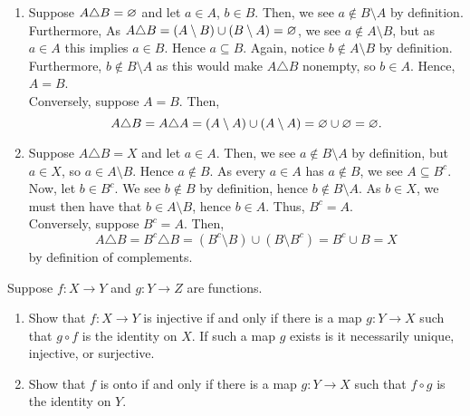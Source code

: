 \documentclass[a4paper]{article}
\begin{document}
\begin{solution}
	\begin{enumerate}
		\item Suppose \(A \triangle B = \varnothing\) and let \(a \in A\), \(b \in B\). Then, we see \(a \not\in B \setminus A\) by definition. Furthermore, As \(A \triangle B = \left( A\setminus B \right) \cup \left( B \setminus A \right)  = \varnothing\), we see \(a \not\in A \setminus B\), but as \(a \in A\) this implies \(a \in B\). Hence \(a \subseteq B\). Again, notice \(b \not\in A \setminus B\) by definition. Furthermore, \(b \not\in B \setminus A\) as this would make \(A\triangle B\) nonempty, so \(b \in A\). Hence, \(A=B\).\\
			Conversely, suppose \(A = B\). Then, \[
				A \triangle B = A \triangle A = \left( A \setminus A \right) \cup \left( A \setminus A \right)  = \varnothing \cup \varnothing = \varnothing
			.\]
		\item Suppose \(A\triangle B = X\) and let \(a \in A\). Then, we see \(a \not\in B \setminus A\) by definition, but \(a \in X\), so \( a \in A \setminus B\). Hence \(a \not\in B\). As every \(a \in A\) has \(a \not\in B\), we see \(A \subseteq B^{c}\). Now, let \(b \in B^{c}\). We see \(b \not\in B\) by definition, hence \(b \not\in B \setminus A\). As \(b \in X\), we must then have that \(b \in A \setminus B\), hence \(b \in A\). Thus, \(B^{c} = A\).\\
			Conversely, suppose \(B^{c} = A\). Then, \[
				A \triangle B = B^{c} \triangle B = \left( B^{c} \setminus B \right)  \cup \left( B \setminus B^{c} \right) = B^{c} \cup B = X
			\] by definition of complements.
	\end{enumerate}
\end{solution}
\begin{problem}[3]
	Suppose \(f:X \to Y\) and \(g: Y\to Z\)  are functions.
	\begin{enumerate}
		\item Show that \(f:X \to Y\) is injective if and only if there is a map \(g: Y \to X\) such that \(g \circ f\) is the identity on \(X\). If such a map \(g\) exists is it necessarily unique, injective, or surjective.
			\item Show that \(f\) is onto if and only if there is a map \(g:Y \to X\) such that \(f \circ g\) is the identity on \(Y\).
	\end{enumerate}
\end{problem}
\end{document}

